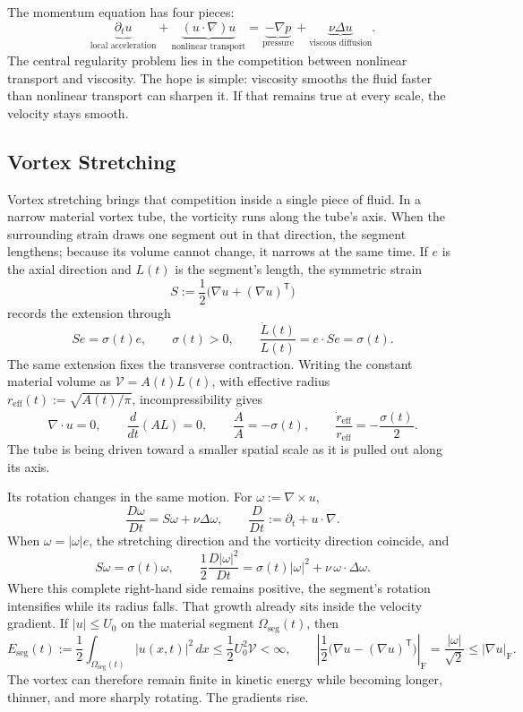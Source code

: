 
The momentum equation has four pieces:
\[
  \underbrace{\partial_t u}_{\text{local acceleration}}
  +
  \underbrace{(u\cdot\nabla)u}_{\text{nonlinear transport}}
  =
  \underbrace{-\nabla p}_{\text{pressure}}
  +
  \underbrace{\nu\Delta u}_{\text{viscous diffusion}}.
\]
The central regularity problem lies in the competition between nonlinear transport and viscosity.
The hope is simple: viscosity smooths the fluid faster than nonlinear transport can sharpen it.
If that remains true at every scale, the velocity stays smooth.

\subsection{Vortex Stretching}\label{sub:ThePerfectlyStretchingVortex}

Vortex stretching brings that competition inside a single piece of fluid.
In a narrow material vortex tube, the vorticity runs along the tube's axis.
When the surrounding strain draws one segment out in that direction, the segment lengthens; because its volume cannot change, it narrows at the same time.
If \(e\) is the axial direction and \(L(t)\) is the segment's length, the symmetric strain
\[
  S:=\frac12\bigl(\nabla u+(\nabla u)^{\mathsf T}\bigr)
\]
records the extension through
\[
  Se=\sigma(t)e,
  \qquad
  \sigma(t)>0,
  \qquad
  \frac{\dot L(t)}{L(t)}
  =
  e\cdot Se
  =
  \sigma(t).
\]
The same extension fixes the transverse contraction.
Writing the constant material volume as \(\mathcal V=A(t)L(t)\), with effective radius \(r_{\mathrm{eff}}(t):=\sqrt{A(t)/\pi}\), incompressibility gives
\[
  \nabla\cdot u=0,
  \qquad
  \frac{d}{dt}(A L)=0,
  \qquad
  \frac{\dot A}{A}=-\sigma(t),
  \qquad
  \frac{\dot r_{\mathrm{eff}}}{r_{\mathrm{eff}}}
  =
  -\frac{\sigma(t)}{2}.
\]
The tube is being driven toward a smaller spatial scale as it is pulled out along its axis.

Its rotation changes in the same motion.
For \(\omega:=\nabla\times u\),
\[
  \frac{D\omega}{Dt}
  =
  S\omega+\nu\Delta\omega,
  \qquad
  \frac{D}{Dt}
  :=
  \partial_t+u\cdot\nabla.
\]
When \(\omega=|\omega|e\), the stretching direction and the vorticity direction coincide, and
\[
  S\omega
  =
  \sigma(t)\omega,
  \qquad
  \frac12\frac{D|\omega|^2}{Dt}
  =
  \sigma(t)|\omega|^2
  +
  \nu\,\omega\cdot\Delta\omega.
\]
Where this complete right-hand side remains positive, the segment's rotation intensifies while its radius falls.
That growth already sits inside the velocity gradient.
If \(|u|\leq U_0\) on the material segment \(\Omega_{\mathrm{seg}}(t)\), then
\[
  E_{\mathrm{seg}}(t)
  :=
  \frac12\int_{\Omega_{\mathrm{seg}}(t)}|u(x,t)|^2\,dx
  \leq
  \frac12U_0^2\mathcal V
  <
  \infty,
  \qquad
  \left|\frac12\bigl(\nabla u-(\nabla u)^{\mathsf T}\bigr)\right|_{\mathrm F}
  =
  \frac{|\omega|}{\sqrt2}
  \leq
  |\nabla u|_{\mathrm F}.
\]
The vortex can therefore remain finite in kinetic energy while becoming longer, thinner, and more sharply rotating.
The gradients rise.

